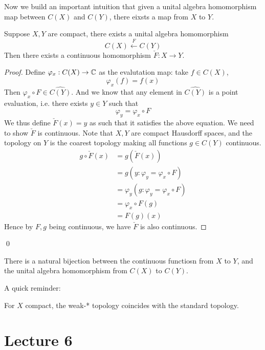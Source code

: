 Now we build an important intuition that given a unital algebra homomorphism map between $C(X)$ and $C(Y)$, there eixsts a map from $X$ to $Y$.
\begin{proposition}
    Suppose $X,Y$ are compact, there exists a unital algebra homomorphism
    \begin{equation*}
        C(X)\xleftarrow{F} C(Y)
    \end{equation*}
    Then there exists a continuous homomorphism $\check{F}: X\to Y$.
\end{proposition}
\begin{proof}
    Define $\varphi_x:C(X)\to\mathbb{C}$ as the evalutation map: take $f\in C(X)$,
    \begin{equation*}
        \varphi_x(f)=f(x)
    \end{equation*}
    Then $\varphi_x\circ F\in\widehat{C(Y)}$. And we know that any element in $\widehat{C(Y)}$ is a point evaluation, i.e. there exists $y\in Y$ such that
    \begin{equation*}
        \varphi_y=\varphi_x\circ F
    \end{equation*}
    We thus define $\check{F}(x)=y$ as such that it satisfies the above equation. We need to show $\check{F}$ is continuous. Note that $X,Y$ are compact Hausdorff spaces, and the topology on $Y$ is the coarest topology making all functions $g\in C(Y)$ continuous.
    \begin{align*}
        g\circ\check{F}(x)&=g(\check{F}(x))\\
        &=g(y: \varphi_y=\varphi_x\circ F)\\
        &=\varphi_y(g: \varphi_y=\varphi_x\circ F)\\
        &=\varphi_x\circ F(g)\\
        &=F(g)(x)
    \end{align*}
    Hence by $F,g$ being continuous, we have $\check{F}$ is also continuous. 
\end{proof}
\qed

There is a natural bijection between the continuous functiosn from $X$ to $Y$, and the unital algebra homomorphism from $C(X)$ to $C(Y)$.

A quick reminder:

\begin{remark}
    For $X$ compact, the weak-* topology coincides with the standard topology.
\end{remark}

\section{Lecture 6}

